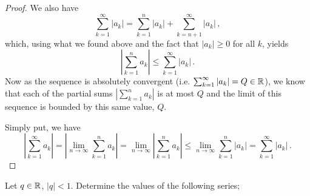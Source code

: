 \documentclass[week=5]{homework}
\begin{document}
\begin{questions}
\begin{proof}
	    	We also have
	    	\[
		    	\sum_{k=1}^{\infty} |a_k| = \sum_{k=1}^{n} |a_k| + \sum_{k=n+1}^{\infty} |a_k|\,,
	    	\]
	    	which, using what we found above and the fact that $|a_k| \geq 0$ for all $k$, yields
	    	\[
		    	\left| \sum_{k=1}^{n} a_k \right| \leq \sum_{k=1}^{\infty} |a_k|\,.
	    	\]
	    	Now as the sequence is absolutely convergent (i.e. $\sum_{k=1}^{\infty} |a_k| = Q \in \mathbb{R}$), we know that each of the partial sums $\left|\sum_{k=1}^{n} a_k\right|$ is at most $Q$ and the limit of this sequence is bounded by this same value, $Q$.
	    	
	    	Simply put, we have
	    	\[
	    	\left| \sum_{k=1}^{\infty} a_k \right| = \left| \lim_{n\to\infty} \sum_{k=1}^{n} a_k \right| = \lim_{n\to\infty} \left|\sum_{k=1}^{n} a_k\right| \leq \lim_{n\to\infty} \sum_{k=1}^{n} |a_k| = \sum_{k=1}^{\infty} |a_k|\,.
	    	\]
	    \end{proof}
    
	    \question
	    Let $q \in \mathbb{R}$, $|q| < 1$. Determine the values of the following series;
	    
     \end{questions}
\end{document}
